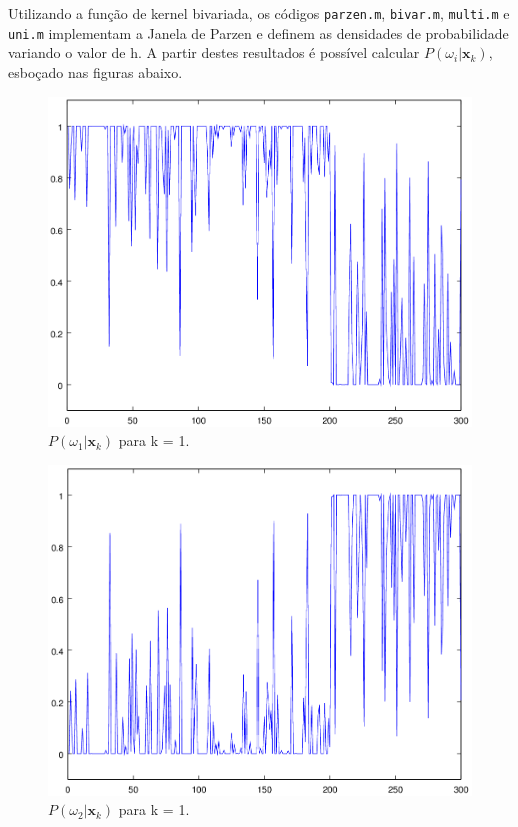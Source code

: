 \documentclass[12pt,twoside]{report}
\newcommand{\captiontext}[1]{\small{#1}}
\newcommand{\code}[1]{\texttt{#1}}
\begin{document}
Utilizando a função de kernel bivariada, os códigos \code{parzen.m}, \code{bivar.m},
\code{multi.m} e \code{uni.m} implementam a Janela de Parzen e definem as densidades
de probabilidade variando o valor de h. A partir destes resultados é possível
calcular $P(\omega_i|\mathbf{x}_k)$, esboçado nas figuras abaixo.

\begin{figure}[H]
    \centering
    \includegraphics[scale=0.35]{parzen-h1-pw1}
    \caption{\captiontext{$P(\omega_1|\mathbf{x}_k)$ para k = 1.}}
    \label{fig:parzen-h1-pw1}
\end{figure}

\begin{figure}[H]
    \centering
    \includegraphics[scale=0.35]{parzen-h1-pw2}
    \caption{\captiontext{$P(\omega_2|\mathbf{x}_k)$ para k = 1.}}
    \label{fig:parzen-h1-pw2}
\end{figure}
\end{document}
